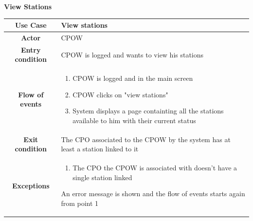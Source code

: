 \documentclass[table, 12pt]{article} %
\begin{document}
\begin{itemize}
             \begin{table}[H]
                \item[] \textbf{View Stations}
                \item[]
                \centering
                \begin{tabular}{|c |m{}|}
                    \hline
                    \textbf{Use Case} & View stations\\ \hline
                    \textbf{Actor} & CPOW\\ \hline
                    \textbf{Entry condition} & CPOW is logged and wants to view his stations\\  \hline
                    \textbf{Flow of events} & \begin{enumerate}
                                                \item CPOW is logged and in the main screen
                                                \item CPOW clicks on "view stations"
                                                \item System displays a page containting all the stations available to him with their current status
                                            \end{enumerate}\\ \hline
                    \textbf{Exit condition} &  The CPO associated to the CPOW by the system has at least a station linked to it\\ \hline
                    \textbf{Exceptions} &  \begin{enumerate}
                        \item The CPO the CPOW is associated with doesn't have a single station linked
                    \end{enumerate}
                    An error message is shown and the flow of events starts again from point 1\\ \hline
                \end{tabular}
            \end{table}


\end{itemize}
\end{document}
